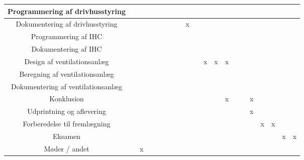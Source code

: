 \documentclass[12pt,a4paper,twoside,landscape]{article}
\begin{document}
\begin{tabular}[c]{|c||l|l|l|l|l|l|l||l|l|l|l|l|l|l||l|l|l|l|l|}
            Programmering af drivhusstyring     & & & &  &  & & & & & & & & & & & & & & \\ \hline
            Dokumentering af drivhusstyring     & & & & & & &  & x & & & & & & & & & & & \\ \hline
            Programmering af IHC                & & & & & & & &  &  &  & & & & & & & & & \\ \hline
            Dokumentering af IHC                & & & & & & &  &  &   & & & & & & & & & & \\ \hline
            Design af ventilationsanlæg         & & & & & & & & & & x & x & x & & & & & & & \\ \hline
            Beregning af ventilationsanlæg      & & & & & & & & & & & & & & & & & & & \\ \hline
            Dokumentering af ventilationsanlæg  & & & & & & & & & & & & & & & & & & & \\ \hline
            Konklusion                          & & & & & & & & & & & & x & & & x & & & & \\ \hline
            Udprintning og aflevering           & & & & & & & & & & & & & & & x & & & & \\ \hline
            Forberedelse til fremlægning        & & & & & & & & & & & & & & & & x & x & & \\ \hline
            Eksamen                             & & & & & & & & & & & & & & & & & & x & x \\ \hline
            Møder / andet                       & & x & & & & & & & & & & & & & & & & & \\ \hline



\end{tabular}
\end{document}
